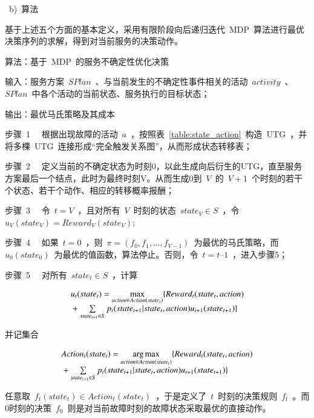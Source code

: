 ~b)~{算法}

基于上述五个方面的基本定义，采用有限阶段向后递归迭代~MDP~算法进行最优决策序列的求解，得到对当前服务的决策动作。

算法：基于~MDP~的服务不确定性优化决策

输入：服务方案~$SPlan$~、与当前发生的不确定性事件相关的活动~$activity$~、
~$SPlan$~中各个活动的当前状态、服务执行的目标状态；

输出：最优马氏策略及其成本

步骤~1~~ 根据出现故障的活动~$a$~，按照表~\ref{table:state_action}~构造~UTG~，并将多棵~UTG~连接形成“完全触发关系图”，从而形成状态转移表；

步骤~2~~ 定义当前的不确定状态为时刻0，以此生成向后衍生的UTG，直至服务方案最后一个结点，此时为最终时刻V。从而生成0到~$V$~的~$V+1$~个时刻的若干个状态、若干个动作、相应的转移概率报酬；

步骤~3~~ 令~$t=V$~，且对所有~$V$~时刻的状态~$state_V \in S$~，令~${u_V}( {state_V} ) = Reward_V( {state_V} )$;

步骤~4~~ 如果~$t=0$~，则~$\pi  = (f_0,f_1,\ldots ,f_{V-1})$~为最优的马氏策略，而~${u_0}( state_0)$~为最优的值函数，算法停止。否则，令~$t=t–1$~，进入步骤5；

步骤~5~~ 对所有~$state_t \in S$~，计算

\begin{equation}\label{equation:backward_mdp}
\begin{array}{l}
{u_t}(stat{e_t}) = \mathop {\max }\limits_{action \in Action(stat{e_t})} \{ Rewar{d_t}(stat{e_t},action)\\
{\rm{                        }} + \sum\limits_{stat{e_{t + 1}} \in S} {{p_t}(stat{e_{t + 1}}|stat{e_t},action){u_{t + 1}}(stat{e_{t + 1}})} \} 
\end{array}
\end{equation}

并记集合

\begin{equation}\label{equation:backward_mdp_arg}
\begin{array}{l}
Actio{n_t}(stat{e_t}) = \mathop {\arg \max }\limits_{action \in Action(stat{e_t})} \{ Rewar{d_t}(stat{e_t},action)\\
{\rm{                       }} + \sum\limits_{stat{e_{t + 1}} \in S} {{p_t}(stat{e_{t + 1}}|stat{e_t},action){u_{t + 1}}(stat{e_{t + 1}})} \} 
\end{array}
\end{equation}

任意取~$f_t(state_t) \in Action_t(state_t)$~，于是定义了~$t$~时刻的决策规则~$f_t$~。而0时刻的决策~$f_0$~则是对当前故障时刻的故障状态采取最优的直接动作。

